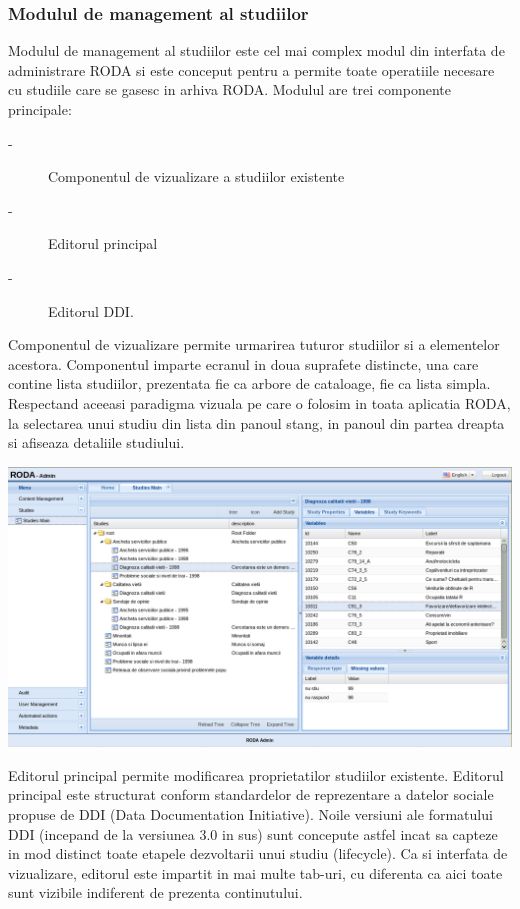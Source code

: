 \documentclass[a4paper, 10pt]{article}
\begin{document}
{\subsubsection{Modulul de management al studiilor}

Modulul de management al studiilor este cel mai complex modul din
interfata de administrare RODA si este conceput pentru a permite toate
operatiile necesare cu studiile care se gasesc in arhiva RODA. Modulul
are trei componente principale:
\begin{description}
\item [{-}] Componentul de vizualizare a studiilor existente 
\item [{-}] Editorul principal 
\item [{-}] Editorul DDI.
\end{description}
Componentul de vizualizare permite urmarirea tuturor studiilor si
a elementelor acestora. Componentul imparte ecranul in doua suprafete
distincte, una care contine lista studiilor, prezentata fie ca arbore
de cataloage, fie ca lista simpla. Respectand aceeasi paradigma vizuala
pe care o folosim in toata aplicatia RODA, la selectarea unui studiu
din lista din panoul stang, in panoul din partea dreapta si afiseaza
detaliile studiului. 

\includegraphics[width=14cm]{img/study-tree-compl}

Editorul principal permite modificarea proprietatilor studiilor existente.
Editorul principal este structurat conform standardelor de reprezentare
a datelor sociale propuse de DDI (Data Documentation Initiative).
Noile versiuni ale formatului DDI (incepand de la versiunea 3.0 in
sus) sunt concepute astfel incat sa capteze in mod distinct toate
etapele dezvoltarii unui studiu (lifecycle). Ca si interfata de vizualizare,
editorul este impartit in mai multe tab-uri, cu diferenta ca aici
toate sunt vizibile indiferent de prezenta continutului.

}
\end{document}
